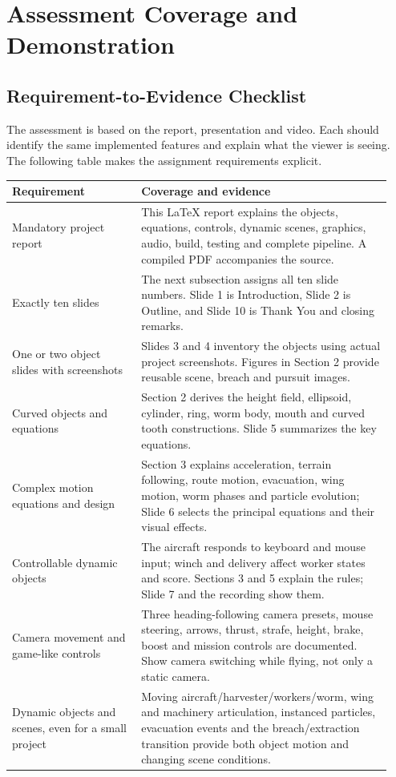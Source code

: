 \clearpage
\section{Assessment Coverage and Demonstration}
\subsection{Requirement-to-Evidence Checklist}
The assessment is based on the report, presentation and video. Each should identify the same implemented features and explain what the viewer is seeing. The following table makes the assignment requirements explicit.
\begin{longtable}{L{0.32\linewidth}L{0.62\linewidth}}
\toprule\textbf{Requirement}&\textbf{Coverage and evidence}\\\midrule\endhead
Mandatory project report & This LaTeX report explains the objects, equations, controls, dynamic scenes, graphics, audio, build, testing and complete pipeline. A compiled PDF accompanies the source.\\
Exactly ten slides & The next subsection assigns all ten slide numbers. Slide 1 is Introduction, Slide 2 is Outline, and Slide 10 is Thank You and closing remarks.\\
One or two object slides with screenshots & Slides 3 and 4 inventory the objects using actual project screenshots. Figures in Section 2 provide reusable scene, breach and pursuit images.\\
Curved objects and equations & Section 2 derives the height field, ellipsoid, cylinder, ring, worm body, mouth and curved tooth constructions. Slide 5 summarizes the key equations.\\
Complex motion equations and design & Section 3 explains acceleration, terrain following, route motion, evacuation, wing motion, worm phases and particle evolution; Slide 6 selects the principal equations and their visual effects.\\
Controllable dynamic objects & The aircraft responds to keyboard and mouse input; winch and delivery affect worker states and score. Sections 3 and 5 explain the rules; Slide 7 and the recording show them.\\
Camera movement and game-like controls & Three heading-following camera presets, mouse steering, arrows, thrust, strafe, height, brake, boost and mission controls are documented. Show camera switching while flying, not only a static camera.\\
Dynamic objects and scenes, even for a small project & Moving aircraft/harvester/workers/worm, wing and machinery articulation, instanced particles, evacuation events and the breach/extraction transition provide both object motion and changing scene conditions.\\

\end{longtable}

